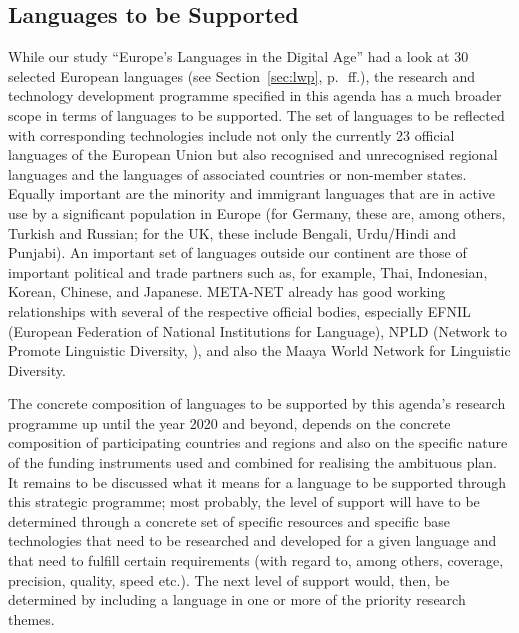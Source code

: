 \documentclass[10pt, plain]{../../metanetpaper}
\begin{document}
\begin{multicols}{2}
\subsection{Languages to be Supported}
\label{sec:languages-to-be-supported}

While our study ``Europe's Languages in the Digital Age'' had a look at 30 selected European languages (see Section~\ref{sec:lwp}, p.~\pageref{sec:lwp}\,ff.), the research and technology development programme specified in this agenda has a much broader scope in terms of languages to be supported. The set of languages to be reflected with corresponding technologies include not only the currently 23 official languages of the European Union but also recognised and unrecognised regional languages and the languages of associated countries or non-member states. Equally important are the minority and immigrant languages that are in active use by a significant population in Europe (for Germany, these are, among others, Turkish and Russian; for the UK, these include Bengali, Urdu/Hindi and Punjabi). An important set of languages outside our continent are those of important political and trade partners such as, for example, Thai, Indonesian, Korean, Chinese, and Japanese. META-NET already has good working relationships with several of the respective official bodies, especially EFNIL (European Federation of National Institutions for Language), NPLD (Network to Promote Linguistic Diversity, \cite{eldia12}), and also the Maaya World Network for Linguistic Diversity.

The concrete composition of languages to be supported by this agenda's research programme up until the year 2020 and beyond, depends on the concrete composition of participating countries and regions and also on the specific nature of the funding instruments used and combined for realising the ambituous plan. It remains to be discussed what it means for a language to be supported through this strategic programme; most probably, the level of support will have to be determined through a concrete set of specific resources and specific base technologies that need to be researched and developed for a given language and that need to fulfill certain requirements (with regard to, among others, coverage, precision, quality, speed etc.). The next level of support would, then, be determined by including a language in one or more of the priority research themes.


\end{multicols}
\end{document}

